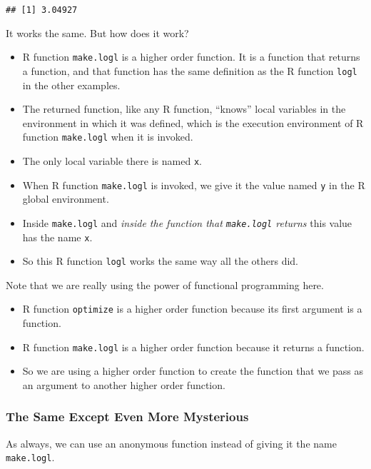 \documentclass[
]{article}
\begin{document}
\begin{verbatim}
## [1] 3.04927
\end{verbatim}

It works the same. But how does it work?

\begin{itemize}
\item
  R function \texttt{make.logl} is a higher order function. It is a
  function that returns a function, and that function has the same
  definition as the R function \texttt{logl} in the other examples.
\item
  The returned function, like any R function, ``knows'' local variables
  in the environment in which it was defined, which is the execution
  environment of R function \texttt{make.logl} when it is invoked.
\item
  The only local variable there is named \texttt{x}.
\item
  When R function \texttt{make.logl} is invoked, we give it the value
  named \texttt{y} in the R global environment.
\item
  Inside \texttt{make.logl} and \emph{inside the function that
  \texttt{make.logl} returns} this value has the name \texttt{x}.
\item
  So this R function \texttt{logl} works the same way all the others
  did.
\end{itemize}

Note that we are really using the power of functional programming here.

\begin{itemize}
\item
  R function \texttt{optimize} is a higher order function because its
  first argument is a function.
\item
  R function \texttt{make.logl} is a higher order function because it
  returns a function.
\item
  So we are using a higher order function to create the function that we
  pass as an argument to another higher order function.
\end{itemize}

\hypertarget{the-same-except-even-more-mysterious}{%
\subsubsection{The Same Except Even More
Mysterious}\label{the-same-except-even-more-mysterious}}

As always, we can use an anonymous function instead of giving it the
name \texttt{make.logl}.
\end{document}

